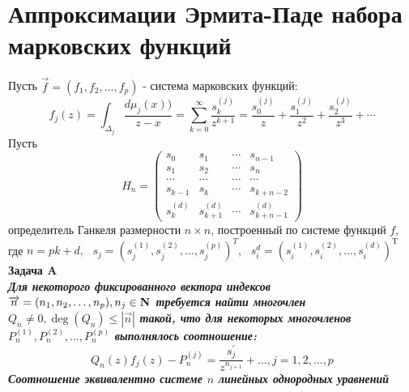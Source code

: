 \section{Аппроксимации Эрмита-Паде набора марковских функций}

Пусть $\overrightarrow{f}=(f_1,f_2,\ldots,f_p)$ - система
марковских функций:
\begin{equation}
\label{Markov_system} f_j(z)
=\int_{\Delta_j}{\displaystyle\frac{d\mu_j(x))}{z-x}}
=\sum\limits_{k=0}^{\infty} \frac { s_{k}^{(j)} } {z^{k+1}}
=\frac { s_{0}^{(j)} } {z} + \frac { s_{1}^{(j)} } {z^{2}} +\frac
{ s_{2}^{(j)} } {z^{3}}+\cdots
\end{equation}
Пусть
\begin{equation}
\label{H} H_n=\left(
\begin{array}{ccccc}
s_0           & s_{1}         & \cdots & s_{n-1}        \\
s_{1}         & s_{2}         & \cdots & s_{n}          \\
\cdots        & \cdots        & \cdots & \cdots         \\
s_{k-1}       & s_{k}         & \cdots & s_{k+n-2}      \\
s_{k}^{(d)}   & s_{k+1}^{(d)} & \cdots & s_{k+n-1}^{(d)}
\end{array}
\right)
\end{equation}
определитель Ганкеля размерности $n \times n$, построенный по
системе функций $f$, где $n=pk+d, \mbox{   }
s_j=(s_j^{(1)},s_j^{(2)},\ldots,s_j^{(p)})^T, \mbox{   }
s_i^{d}=(s_i^{(1)},s_i^{(2)},\ldots,s_i^{(d)})^{\mbox{T}}$ \\
\bf Задача A \rm \\ \it Для некоторого фиксированного вектора
индексов $\overrightarrow{n}=(n_1,n_2,\ldots,n_p),n_j\in{ \bf N
\rm }$ требуется найти многочлен $Q_n\not=0,\deg
(Q_n)\leq{|\overrightarrow{n}|}$ такой, что для некоторых
многочленов $P_n^{(1)},P_n^{(2)},\ldots,P_n^{(p)}$ выполнялось
соотношение: \rm
\begin{equation}
\label{Vector_Pade} Q_n(z)f_j(z)-P_n^{(j)}= \frac {s_j^{'}}
{z^{n_{j+1}}} +\ldots,j=1,2,\ldots,p
\end{equation}
Соотношение эквивалентно системе $n$ линейных однородных уравнений
